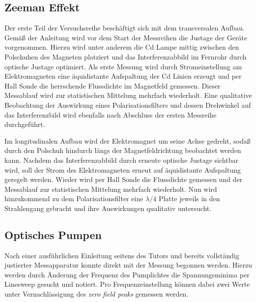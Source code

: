 \documentclass[../main.tex]{subfiles}
\begin{document}
    \subsection{Zeeman Effekt}
        Der erste Teil der Versuchsreihe beschäftigt sich mit dem transversalen Aufbau. Gemäß der Anleitung wird vor dem Start der Messreihen die Justage der Geräte vorgenommen. Hierzu wird unter anderem die Cd Lampe mittig zwischen den Polschuhen des Magneten platziert und das Interferenzabbild im Fernrohr durch optische Justage optimiert. Als erste Messung wird durch Stromeinstellung am Elektromagneten eine äquidistante Aufspaltung der Cd Linien erzeugt und per Hall Sonde die herrschende Flussdichte im Magnetfeld gemessen. Dieser Messablauf wird zur statistischen Mittelung mehrfach wiederholt. Eine qualitative Beobachtung der Auswirkung eines Polarisationsfilters und dessen Drehwinkel auf das Interferenzbild wird ebenfalls nach Abschluss der ersten Messreihe durchgeführt.

        Im longitudinalen Aufbau wird der Elektromagnet um seine Achse gedreht, sodaß durch den Polschuh hindurch längs der Magnetfeldrichtung beobachtet werden kann. Nachdem das Interferenzabbild durch erneute optische Justage sichtbar wird, soll der Strom des Elektromagneten erneut auf äquidistante Aufspaltung geregelt werden. Wieder wird per Hall Sonde die Flussdichte gemessen und der Messablauf zur statistischen Mittelung mehrfach wiederholt. Nun wird hinzukommend zu dem Polarisationsfilter eine $\lambda/4$ Platte jeweils in den Strahlengang gebracht und ihre Auswirkungen qualitativ untersucht. 


    \subsection{Optisches Pumpen}
        Nach einer ausführlichen Einleitung seitens des Tutors und bereits vollständig justierter Messapparatur konnte direkt mit der Messung begonnen werden. Hierzu werden durch Änderung der Frequenz des Pumplichtes die Spannungsminima per Linesweep gesucht und notiert. Pro Frequenzeinstellung können dabei zwei Werte unter Vernachlässigung des \emph{zero field peaks} gemessen werden. 

   
\end{document}
